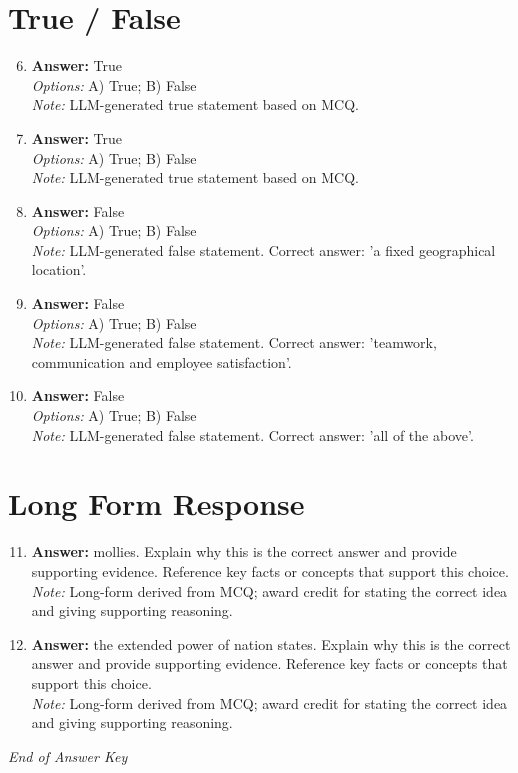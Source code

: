 \documentclass[12pt]{article}
\begin{document}
\section*{True / False}
\begin{enumerate}[label=\arabic*.]
\setcounter{enumi}{5}
\item \textbf{Answer:} True
\\ \textit{Options:} A) True; B) False
\\ \textit{Note:} LLM-generated true statement based on MCQ.
\item \textbf{Answer:} True
\\ \textit{Options:} A) True; B) False
\\ \textit{Note:} LLM-generated true statement based on MCQ.
\item \textbf{Answer:} False
\\ \textit{Options:} A) True; B) False
\\ \textit{Note:} LLM-generated false statement. Correct answer: 'a fixed geographical location'.
\item \textbf{Answer:} False
\\ \textit{Options:} A) True; B) False
\\ \textit{Note:} LLM-generated false statement. Correct answer: 'teamwork, communication and employee satisfaction'.
\item \textbf{Answer:} False
\\ \textit{Options:} A) True; B) False
\\ \textit{Note:} LLM-generated false statement. Correct answer: 'all of the above'.
\end{enumerate}

\section*{Long Form Response}
\begin{enumerate}[label=\arabic*.]
\setcounter{enumi}{10}
\item \textbf{Answer:} mollies. Explain why this is the correct answer and provide supporting evidence. Reference key facts or concepts that support this choice.
\\ \textit{Note:} Long-form derived from MCQ; award credit for stating the correct idea and giving supporting reasoning.
\item \textbf{Answer:} the extended power of nation states. Explain why this is the correct answer and provide supporting evidence. Reference key facts or concepts that support this choice.
\\ \textit{Note:} Long-form derived from MCQ; award credit for stating the correct idea and giving supporting reasoning.
\end{enumerate}

\vfill
\noindent\textit{End of Answer Key}
\end{document}
